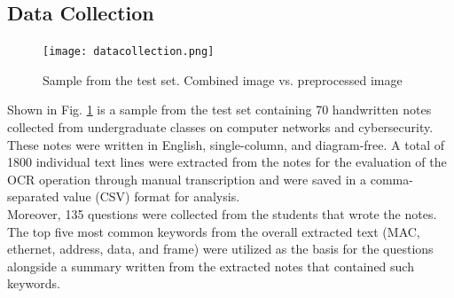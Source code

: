 \documentclass[conference]{IEEEtran}
\begin{document}
\subsection{Data Collection}
\vspace{-0.2cm}
\begin{figure}[H]
\centerline{\texttt{[image: datacollection.png]}}
\vspace{-0.3cm}
\caption{Sample from the test set. Combined image vs. preprocessed image} 
\label{datacollection}
\end{figure}
\indent Shown in Fig. \ref{datacollection} is a sample 
from the test set containing 70 handwritten notes collected from undergraduate
classes on computer networks and cybersecurity. These notes were
written in English, single-column, and diagram-free. A total of
1800 individual text lines were extracted from the notes for the
evaluation of the OCR operation through manual transcription
and were saved in a comma-separated value (CSV) format for 
analysis. \\
\indent Moreover, 135 questions were collected from the students that wrote the 
notes. The top five most common keywords from the overall extracted text 
(MAC, ethernet, address, data, and frame) were utilized as the basis 
for the questions alongside a summary written from the extracted notes 
that contained such keywords. 
\end{document}
